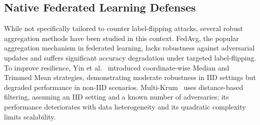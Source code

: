 \documentclass[conference]{IEEEtran}
\begin{document}


\subsection{Native Federated Learning Defenses}

While not specifically tailored to counter label-flipping attacks, several robust aggregation methods have been studied in this context. FedAvg\cite{fedavg-pmlr-v54-mcmahan17a}, the popular aggregation mechanism in federated learning, lacks robustness against adversarial updates and suffers significant accuracy degradation under targeted label-flipping. To improve resilience, Yin et al.~\cite{yin2018byzantine} introduced coordinate-wise Median and Trimmed Mean strategies, demonstrating moderate robustness in IID settings but degraded performance in non-IID scenarios. Multi-Krum~\cite{NIPS2017_f4b9ec30} uses distance-based filtering, assuming an IID setting and a known number of adversaries; its performance deteriorates with data heterogeneity and its quadratic complexity limits scalability.
\end{document}
